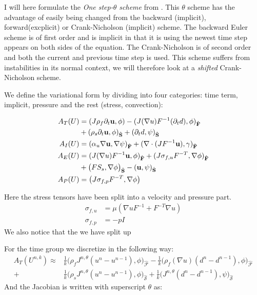 I will here formulate the \textit{One step-$\theta$ scheme} from \cite{Wick2011}. This $\theta$ scheme has the advantage of easily being changed from the backward (implicit), forward(excplicit) or Crank-Nicholson (implicit) scheme. The backward Euler scheme is of first order and is implicit in that it is using the newest time step appears on both sides of the equation. The Crank-Nicholson is of second order and both the current and previous time step is used. This scheme suffers from instabilities in its normal context, we will therefore look at a \textit{shifted} Crank-Nicholson scheme. 

We define the variational form by dividing into four categories: time term, implicit, pressure and the rest (stress, convection):

\begin{align}
A_T(U) &= (J \rho_f \partial_t \bold{u} , \phi ) - (J (\nabla u)F^{-1}(\partial_t d) , \phi )_{\mathcal{\hat{F}}} \\
	    & + (\rho_s \partial_t \bold{u} , \phi)_{\mathcal{\hat{S}}} + (\partial_t d , \psi)_{\mathcal{\hat{S}}}  \\
A_I(U) &= ( \alpha_u \nabla \bold{u}, \nabla \psi)_{\mathcal{\hat{F}}} + (\nabla \cdot (J F^{-1} \bold{u}), \gamma)_{\mathcal{\hat{F}}} \\
A_E(U) &= (J (\nabla u)F^{-1} \bold{u} , \phi )_{\mathcal{\hat{F}}} + ( J \sigma_{f,u} F^{-T} , \nabla \phi )_{\mathcal{\hat{F}}} \\
	    & + \big(F S_s, \nabla \phi \big)_{\mathcal{\hat{S}}} - ( \bold{u} , \psi )_{\mathcal{\hat{S}}} \\
A_P(U) &= \big( J \sigma_{f,p} F^{-T}, \nabla \phi  \big)  	 		
\end{align}

Here the stress tensors have been split into a velocity and pressure part. 
\begin{align}
\sigma_{f,u} &= \mu ( \nabla u F^{-1} + F^{-T} \nabla u) \\
\sigma_{f,p} &= -p I
\end{align}
We also notice that the we have split up 

For the time group we discretize in the following way:
\begin{align}
A_T(U^{n,k}) \approx & \frac{1}{k} \big( \rho_f J^{n,\theta} (u^n - u^{n-1}) , \phi  \big)_{\mathcal{\hat{F}}} - \frac{1}{k} \big( \rho_f (\nabla u ) (d^n - d^{n-1}) , \phi \big)_{\mathcal{\hat{F}}} \\
+ & \frac{1}{k} \big( \rho_s J^{n,\theta} (u^n - u^{n-1}) , \phi  \big)_{\mathcal{\hat{S}}} +  \frac{1}{k} \big(  J^{n,\theta} (d^n - d^{n-1}) , \psi  \big)_{\mathcal{\hat{S}}}
\end{align}
And the Jacobian is written with superscript $\theta$ as:

